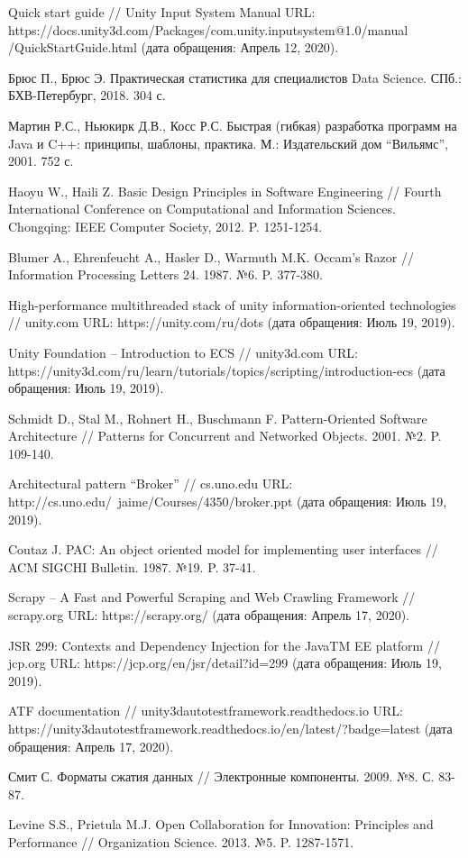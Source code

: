 \begin{thebibliography}{9}
	 Quick start guide // Unity Input System Manual URL: https://docs.unity3d.com/Packages/com.unity.inputsystem@1.0/manual /QuickStartGuide.html (дата обращения: Апрель 12, 2020).
	
	 Брюс П., Брюс Э. Практическая статистика для специалистов Data Science. СПб.: БХВ-Петербург, 2018. 304 с.
	
	 Мартин Р.С., Ньюкирк Д.В., Косс Р.С. Быстрая (гибкая) разработка программ на Java и C++: принципы, шаблоны, практика. М.: Издательский дом ``Вильямс'', 2001. 752 с.

	 Haoyu W., Haili Z. Basic Design Principles in Software Engineering // Fourth International Conference on Computational and Information Sciences. Chongqing: IEEE Computer Society, 2012. P. 1251-1254.
	
	 Blumer A., Ehrenfeucht A., Hasler D., Warmuth M.K. Occam's Razor // Information Processing Letters 24. 1987. №6. P. 377-380.
	
	 High-performance multithreaded stack of unity information-oriented technologies // unity.com URL: https://unity.com/ru/dots (дата обращения: Июль 19, 2019).
	
	 Unity Foundation -- Introduction to ECS // unity3d.com URL: https://unity3d.com/ru/learn/tutorials/topics/scripting/introduction-ecs (дата обращения: Июль 19, 2019).
	
	 Schmidt D., Stal M., Rohnert H., Buschmann F. Pattern-Oriented Software Architecture // Patterns for Concurrent and Networked Objects. 2001. №2. P. 109-140.
	
	 Architectural pattern ``Broker'' // cs.uno.edu URL: http://cs.uno.edu/~jaime/Courses/4350/broker.ppt (дата обращения: Июль 19, 2019).
	
	 Coutaz J. PAC: An object oriented model for implementing user interfaces // ACM SIGCHI Bulletin. 1987. №19. P. 37-41.
	
	 Scrapy -- A Fast and Powerful Scraping and Web Crawling Framework // scrapy.org URL: https://scrapy.org/ (дата обращения: Апрель 17, 2020).
	
	 JSR 299: Contexts and Dependency Injection for the JavaTM EE platform // jcp.org URL: https://jcp.org/en/jsr/detail?id=299 (дата обращения: Июль 19, 2019).
	
	 ATF documentation // unity3dautotestframework.readthedocs.io URL: https://unity3dautotestframework.readthedocs.io/en/latest/?badge=latest (дата обращения: Апрель 17, 2020).
	
	 Смит С. Форматы сжатия данных // Электронные компоненты. 2009. №8. С. 83-87.
	
	 Levine S.S., Prietula M.J. Open Collaboration for Innovation: Principles and Performance // Organization Science. 2013. №5. P. 1287-1571.
	
\end{thebibliography}